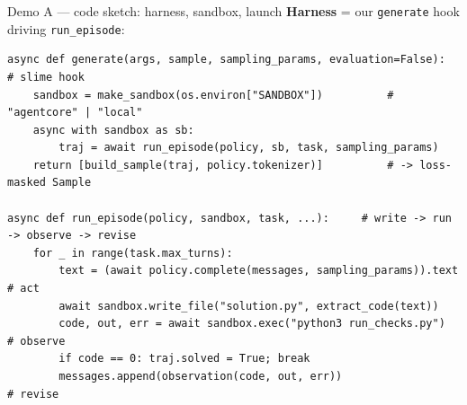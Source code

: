 \documentclass[aspectratio=169]{beamer}
\begin{document}
\begin{frame}[fragile]{Demo A --- code sketch: harness, sandbox, launch}
  \footnotesize\textbf{Harness} = our \texttt{generate} hook driving \texttt{run\_episode}:
\begin{lstlisting}[basicstyle=\ttfamily\scriptsize]
async def generate(args, sample, sampling_params, evaluation=False):   # slime hook
    sandbox = make_sandbox(os.environ["SANDBOX"])          # "agentcore" | "local"
    async with sandbox as sb:
        traj = await run_episode(policy, sb, task, sampling_params)
    return [build_sample(traj, policy.tokenizer)]          # -> loss-masked Sample

async def run_episode(policy, sandbox, task, ...):     # write -> run -> observe -> revise
    for _ in range(task.max_turns):
        text = (await policy.complete(messages, sampling_params)).text        # act
        await sandbox.write_file("solution.py", extract_code(text))
        code, out, err = await sandbox.exec("python3 run_checks.py")           # observe
        if code == 0: traj.solved = True; break
        messages.append(observation(code, out, err))                          # revise
\end{lstlisting}
\end{frame}
\end{document}
